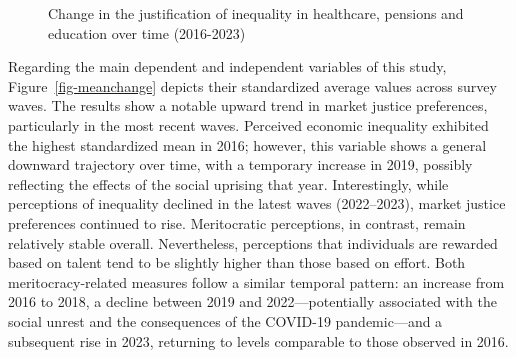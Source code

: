 \documentclass[
  12pt,
]{article}
\begin{document}
\begin{figure}[H]

\caption{\label{fig-alluvial}Change in the justification of inequality
in healthcare, pensions and education over time (2016-2023)}


\end{figure}%

Regarding the main dependent and independent variables of this study,
Figure~\ref{fig-meanchange} depicts their standardized average values
across survey waves. The results show a notable upward trend in market
justice preferences, particularly in the most recent waves. Perceived
economic inequality exhibited the highest standardized mean in 2016;
however, this variable shows a general downward trajectory over time,
with a temporary increase in 2019, possibly reflecting the effects of
the social uprising that year. Interestingly, while perceptions of
inequality declined in the latest waves (2022--2023), market justice
preferences continued to rise. Meritocratic perceptions, in contrast,
remain relatively stable overall. Nevertheless, perceptions that
individuals are rewarded based on talent tend to be slightly higher than
those based on effort. Both meritocracy-related measures follow a
similar temporal pattern: an increase from 2016 to 2018, a decline
between 2019 and 2022---potentially associated with the social unrest
and the consequences of the COVID-19 pandemic---and a subsequent rise in
2023, returning to levels comparable to those observed in 2016.
\end{document}
